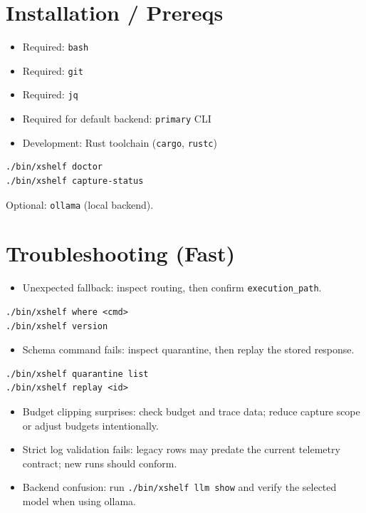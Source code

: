 \documentclass[11pt]{article}
\begin{document}
\section*{Installation / Prereqs}
\begin{itemize}
  \item Required: \texttt{bash}
  \item Required: \texttt{git}
  \item Required: \texttt{jq}
  \item Required for default backend: \texttt{primary} CLI
  \item Development: Rust toolchain (\texttt{cargo}, \texttt{rustc})
\end{itemize}

\begin{lstlisting}[style=cx]
./bin/xshelf doctor
./bin/xshelf capture-status
\end{lstlisting}
Optional: \texttt{ollama} (local backend).

\section*{Troubleshooting (Fast)}
\begin{itemize}
  \item Unexpected fallback: inspect routing, then confirm \texttt{execution\_path}.
\end{itemize}
\begin{lstlisting}[style=cx]
./bin/xshelf where <cmd>
./bin/xshelf version
\end{lstlisting}
\begin{itemize}
  \item Schema command fails: inspect quarantine, then replay the stored response.
\end{itemize}
\begin{lstlisting}[style=cx]
./bin/xshelf quarantine list
./bin/xshelf replay <id>
\end{lstlisting}
\begin{itemize}
  \item Budget clipping surprises: check budget and trace data; reduce capture scope or adjust budgets intentionally.
  \item Strict log validation fails: legacy rows may predate the current telemetry contract; new runs should conform.
  \item Backend confusion: run \texttt{./bin/xshelf llm show} and verify the selected model when using ollama.
\end{itemize}
\end{document}
